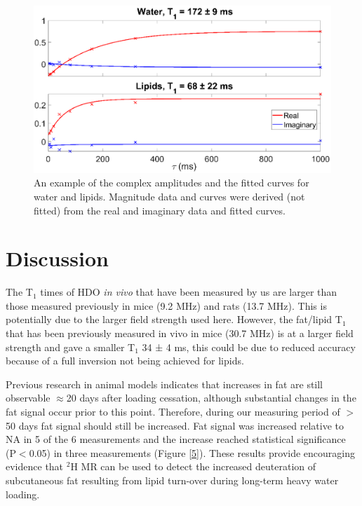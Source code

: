 \documentclass[class=article, crop=false]{standalone}
\begin{document}
\begin{figure}
    \centering
    \includegraphics[width=1\textwidth]{Figures/Lipid/Amp_Tau.png}
    \caption{An example of the complex amplitudes and the fitted curves for water and lipids. Magnitude data and curves were derived (not fitted) from the real and imaginary data and fitted curves. }
    \label{fig:Lip:Amp_Tau}
\end{figure}

\section{Discussion}

The T$_1$ times of HDO \textit{in vivo} that have been measured by us are larger than those measured previously in mice\cite{Fung1979StudyWater} (9.2 MHz) and rats\cite{Block1987COMMUNICATIONSTissues} (13.7 MHz). This is potentially due to the larger field strength used here. However, the fat/lipid T$_1$ that has been previously measured in vivo in mice (30.7 MHz) is at a larger field strength and gave a smaller T$_1$ 34 ± 4 ms\cite{Brereton1986PreliminarySpectroscopy}, this could be due to reduced accuracy because of a full inversion not being achieved for lipids. 

Previous research in animal models indicates that increases in fat are still observable $\approx$20 days after loading cessation, although substantial changes in the fat signal occur prior to this point\cite{Brereton1986PreliminarySpectroscopy}. Therefore, during our measuring period of $>$ 50 days fat signal should still be increased. Fat signal was increased relative to NA in 5 of the 6 measurements and the increase reached statistical significance (P$<$0.05) in three measurements (Figure \ref{5}). These results provide encouraging evidence that $^2$H MR can be used to detect the increased deuteration of subcutaneous fat resulting from lipid turn-over during long-term heavy water loading. 
\end{document}
